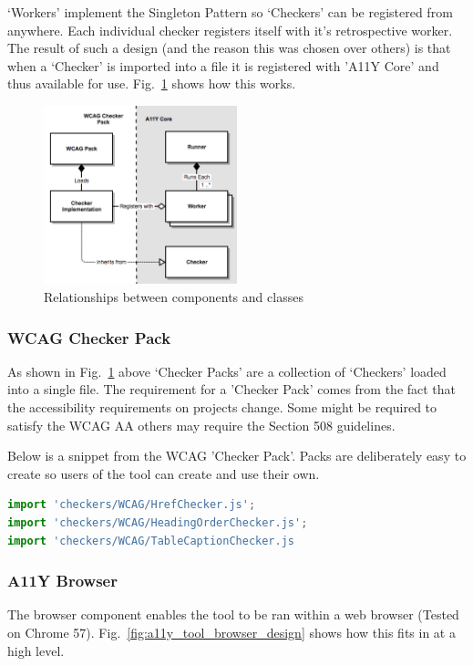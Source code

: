 `Workers' implement the Singleton Pattern so `Checkers' can be registered from
anywhere. Each individual checker registers itself with it's retrospective
worker. The result of such a design (and the reason this was chosen over others)
is that when a `Checker' is imported into a file it is registered with 'A11Y
Core' and thus available for use. Fig.~\ref{fig:a11y_tool_worker_design}
shows how this works.

\begin{figure}[H]
\centering
\includegraphics[width=0.5\textwidth]{figures/a11y_tool_worker_design}
\captionsetup{justification=centering}
\caption{Relationships between components and classes
\label{fig:a11y_tool_worker_design}}
\end{figure}

\subsubsection{WCAG Checker Pack}
As shown in Fig.~\ref{fig:a11y_tool_worker_design} above `Checker Packs' are
a collection of `Checkers' loaded into a single file. The requirement for a
'Checker Pack' comes from the fact that the accessibility requirements on
projects change. Some might be required to satisfy the WCAG AA others may
require the Section 508 guidelines.

Below is a snippet from the WCAG 'Checker Pack'. Packs are deliberately easy to
create so users of the tool can create and use their own.

\begin{lstlisting}[language=JavaScript]
import 'checkers/WCAG/HrefChecker.js';
import 'checkers/WCAG/HeadingOrderChecker.js';
import 'checkers/WCAG/TableCaptionChecker.js
\end{lstlisting}

\subsubsection{A11Y Browser}
The browser component enables the tool to be ran within a web browser (Tested
on Chrome 57). Fig.~\ref{fig:a11y_tool_browser_design} shows how this fits in
 at a high level.

